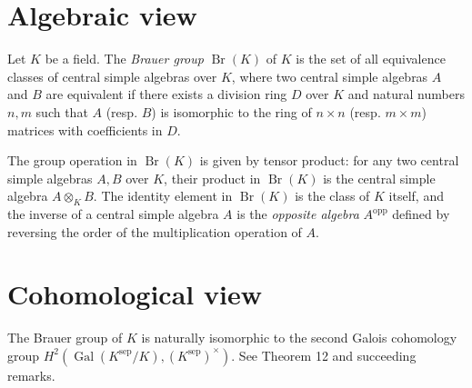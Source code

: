 \documentclass{article}
\begin{document}
\section{Algebraic view}

Let $K$ be a field. The {\em Brauer group} $\operatorname{Br}(K)$ of $K$ is the set of all equivalence classes of central simple algebras over $K$, where two central simple algebras $A$ and $B$ are equivalent if there exists a division ring $D$ over $K$ and natural numbers $n,m$ such that $A$ (resp. $B$) is isomorphic to the ring of $n \times n$ (resp. $m \times m$) matrices with coefficients in $D$.

The group operation in $\operatorname{Br}(K)$ is given by tensor product: for any two central simple algebras $A,B$ over $K$, their
product in $\operatorname{Br}(K)$ is the central simple algebra $A \otimes_K B$. The identity element in $\operatorname{Br}(K)$ is the class of $K$ itself, and the inverse of a central simple algebra $A$ is
the {\em opposite algebra} $A^{\operatorname{opp}}$ defined by reversing
the order of the multiplication operation of $A$.

\section{Cohomological view}

The Brauer group of $K$ is naturally isomorphic to the second Galois cohomology group 
$H^2({\operatorname{Gal}}(K^{\operatorname{sep}}/K),
(K^{\operatorname{sep}})^{\times})$.
See  Theorem 12 and succeeding remarks.
\end{document}
